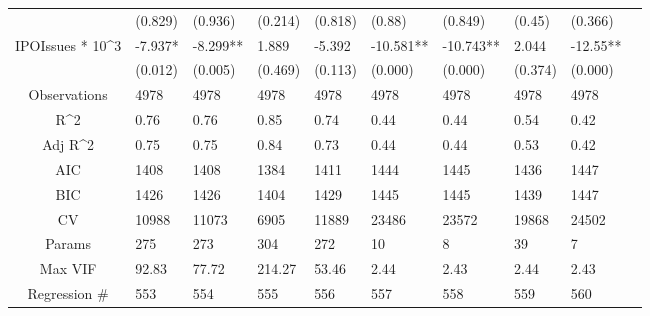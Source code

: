 \documentclass{article}
\begin{document}
\begin{table}[H]
\begin{tabular}{|clllllllll|}
   & (0.829) & (0.936) & (0.214) & (0.818) & (0.88) & (0.849) & (0.45) & (0.366) & \\ 
  IPOIssues * 10^3 & -7.937* & -8.299** & 1.889 & -5.392 & -10.581** & -10.743** & 2.044 & -12.55** & \\ 
   & (0.012) & (0.005) & (0.469) & (0.113) & (0.000) & (0.000) & (0.374) & (0.000) & \\ 
  \hline 
 Observations & 4978 & 4978 & 4978 & 4978 & 4978 & 4978 & 4978 & 4978 & \\ 
  R^2 & 0.76 & 0.76 & 0.85 & 0.74 & 0.44 & 0.44 & 0.54 & 0.42 & \\ 
  Adj R^2 & 0.75 & 0.75 & 0.84 & 0.73 & 0.44 & 0.44 & 0.53 & 0.42 & \\ 
  AIC & 1408 & 1408 & 1384 & 1411 & 1444 & 1445 & 1436 & 1447 & \\ 
  BIC & 1426 & 1426 & 1404 & 1429 & 1445 & 1445 & 1439 & 1447 & \\ 
  CV & 10988 & 11073 & 6905 & 11889 & 23486 & 23572 & 19868 & 24502 & \\ 
  Params & 275 & 273 & 304 & 272 & 10 & 8 & 39 & 7 & \\ 
  Max VIF & 92.83 & 77.72 & 214.27 & 53.46 & 2.44 & 2.43 & 2.44 & 2.43 & \\ 
  Regression \# & 553 & 554 & 555 & 556 & 557 & 558 & 559 & 560 & \\ 
   \hline
\end{tabular}
 
\end{table}
\end{document}
